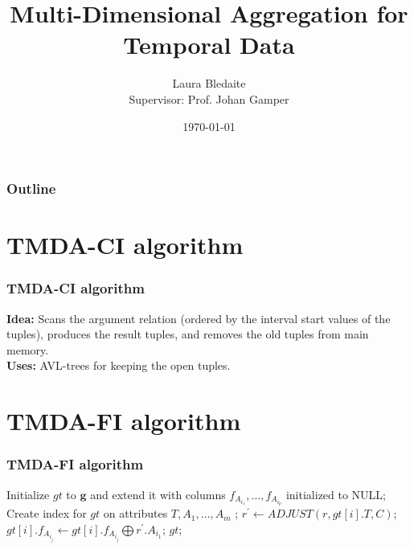\documentclass[]{beamer}
\title{Multi-Dimensional Aggregation for Temporal Data}    %
\author{Laura Bledaite\\ Supervisor: Prof. Johan Gamper}                 %
\institute{Free University of Bozen - Bolzano}      %
\date{\today}                    %
\renewcommand{\vec}[1]{\mathbf{#1}}
\begin{document}
\begin{frame}
  \titlepage
\end{frame}


\section[Outline]{}

\begin{frame}
  \frametitle{Outline}
  \tableofcontents
\end{frame}


\section{TMDA-CI algorithm}

\begin{frame}
 
\frametitle{TMDA-CI algorithm}   %

\textbf{Idea:} Scans the argument relation (ordered by the interval start values of the tuples), produces the result tuples, and removes the old tuples from main memory.\\

\textbf{Uses: } AVL-trees for keeping the open tuples.
\end{frame}


\section{TMDA-FI algorithm}
\begin{frame}
  \frametitle{TMDA-FI algorithm}   %

\begin{algorithmic}
\STATE Initialize $gt$ to $\vec{g}$ and extend it with columns $f_{A_{i_1}} , \dots , f_{A_{i_p}}$ initialized to NULL;
\STATE Create index for $gt$ on attributes $T, A_1,\dots,A_m$ ;
\FORALL{tuple $r \in \vec{r}$} 
\STATE $r^{'} \leftarrow ADJUST(r, gt[i].T, C)$; 
\FORALL{$f_j \in \vec{F}$}
\STATE $gt[i].f_{A_{i_j}} \leftarrow gt[i].f_{A_{i_j}} \bigoplus r^{'}.A_{i_1}$; 
\ENDFOR
\ENDFOR
\ENDFOR
\RETURN $gt$;
\end{algorithmic}

\end{frame}
\end{document}
